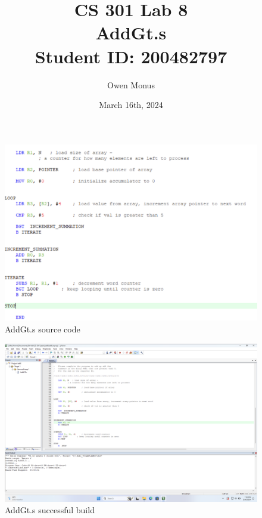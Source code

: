 \documentclass{article}
\begin{document}
\title{CS 301 Lab 8\\[0.5cm]\large AddGt.s\\[0.5cm]\large Student ID: 200482797}
\author{Owen Monus}
\date{March 16th, 2024}

\maketitle

\pagebreak

\centering
\begin{figure}
\caption{AddGt.s source code}
\includegraphics[width=\textwidth]{../../Images/AddGt_sourceCode.png}
\end{figure}

\begin{figure}
\caption{AddGt.s successful build}
\includegraphics[width=\textwidth]{../../Images/AddGt_Build.png}
\end{figure}
\end{document}
